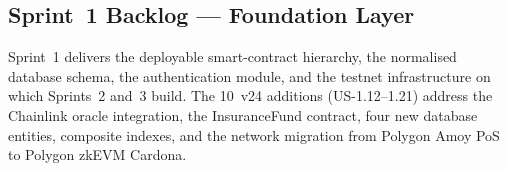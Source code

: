 \subsection{Sprint~1 Backlog --- Foundation Layer}
\label{sec:sprint1}

Sprint~1 delivers the deployable smart-contract hierarchy, the normalised
database schema, the authentication module, and the testnet infrastructure
on which Sprints~2 and~3 build. The 10~v24 additions (US-1.12--1.21) address
the Chainlink oracle integration, the InsuranceFund contract, four new
database entities, composite indexes, and the network migration from Polygon
Amoy PoS to Polygon zkEVM Cardona.

